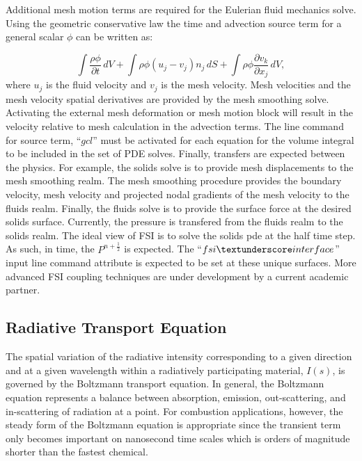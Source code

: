 Additional mesh motion terms are required for the Eulerian fluid mechanics solve.
Using the geometric conservative law the time and advection source term for a general
scalar $\phi$ can be written as:

\begin{equation}
   \int \frac {\rho \phi } {\partial t}\, dV + \int \rho \phi \left ( u_j - v_j \right) n_j\, dS 
   + \int \rho \phi \frac{\partial v_k}{\partial x_j}\, dV,
\label{gcl}
\end{equation}
where  $u_j$ is the fluid velocity and $v_j$ is the mesh velocity. Mesh velocities and the 
mesh velocity spatial derivatives are provided by the mesh smoothing solve. Activating the external
mesh deformation or mesh motion block will result in the velocity relative to mesh calculation
in the advection terms. The  line command for source term, ``$gcl$'' must be activated for each equation for 
the volume integral to be included in the set of PDE solves.
Finally, transfers are expected between the physics. For example, the solids solve is to provide mesh
displacements to the mesh smoothing realm. The mesh smoothing procedure provides the boundary velocity,
mesh velocity and projected nodal gradients of the mesh velocity to the fluids realm. Finally, the fluids
solve is to provide the surface force at the desired solids surface. Currently, the pressure is transfered
from the fluids realm to the solids realm. The ideal view of FSI is to solve the solids pde at the half 
time step. As such, in time, the $P^{n+\frac{1}{2}}$ is expected. The ``$fsi \textunderscore interface$'' 
input line command attribute is expected to be set at these unique surfaces. More advanced FSI coupling 
techniques are under development by a current academic partner.

\subsection{Radiative Transport Equation}
The spatial variation of the radiative intensity corresponding to 
a given direction and at a given wavelength within a radiatively 
participating material, $I(s)$, is governed by the Boltzmann transport 
equation.  In general, the Boltzmann equation represents a balance 
between absorption, emission, out-scattering, and in-scattering of 
radiation at a point.  For combustion applications, however, the 
steady form of the Boltzmann equation is appropriate since the 
transient term only becomes important on nanosecond time scales 
which is orders of magnitude shorter than the fastest chemical.

